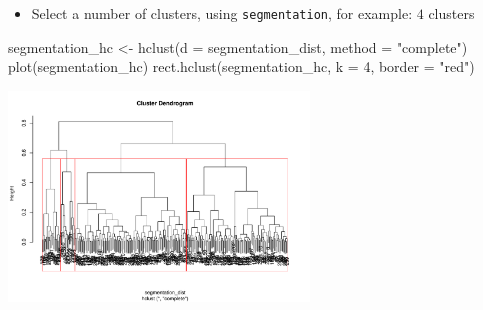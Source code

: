 \documentclass[
  ignorenonframetext,
]{beamer}
\newenvironment{Shaded}{\begin{snugshade}}{\end{snugshade}}
\newcommand{\AttributeTok}[1]{\textcolor[rgb]{0.40,0.45,0.13}{#1}}
\newcommand{\DecValTok}[1]{\textcolor[rgb]{0.68,0.00,0.00}{#1}}
\newcommand{\FunctionTok}[1]{\textcolor[rgb]{0.28,0.35,0.67}{#1}}
\newcommand{\NormalTok}[1]{\textcolor[rgb]{0.00,0.23,0.31}{#1}}
\newcommand{\OtherTok}[1]{\textcolor[rgb]{0.00,0.23,0.31}{#1}}
\newcommand{\StringTok}[1]{\textcolor[rgb]{0.13,0.47,0.30}{#1}}
\providecommand{\tightlist}{%
  \setlength{\itemsep}{0pt}\setlength{\parskip}{0pt}}\usepackage{longtable,booktabs,array}
\begin{document}
\begin{frame}[fragile]{}
\label{section-32}
\begin{itemize}
\tightlist
\item
  Select a number of clusters, using \texttt{segmentation}, for example:
  \(4\) clusters
\end{itemize}

\tiny

\begin{Shaded}
\begin{Highlighting}[]
\NormalTok{segmentation\_hc }\OtherTok{\textless{}{-}} \FunctionTok{hclust}\NormalTok{(}\AttributeTok{d =}\NormalTok{ segmentation\_dist,}
                          \AttributeTok{method =} \StringTok{"complete"}\NormalTok{)}
\FunctionTok{plot}\NormalTok{(segmentation\_hc)}
\FunctionTok{rect.hclust}\NormalTok{(segmentation\_hc, }\AttributeTok{k =} \DecValTok{4}\NormalTok{, }\AttributeTok{border =} \StringTok{"red"}\NormalTok{)}
\end{Highlighting}
\end{Shaded}

\begin{center}
\includegraphics[width=0.6\textwidth,height=\textheight]{011_segmentation_clustering_files/figure-beamer/unnamed-chunk-22-1.pdf}
\end{center}
\end{frame}
\end{document}
